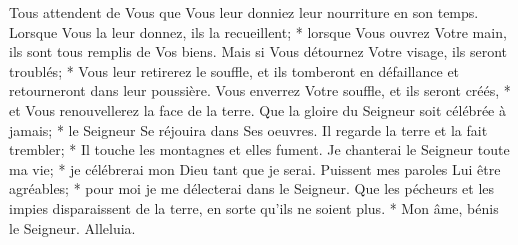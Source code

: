 Tous attendent de Vous que Vous leur donniez leur nourriture en son temps.
Lorsque Vous la leur donnez, ils la recueillent; * lorsque Vous ouvrez Votre main, ils sont tous remplis de Vos biens.
Mais si Vous détournez Votre visage, ils seront troublés; * Vous leur retirerez le souffle, et ils tomberont en défaillance et retourneront dans leur poussière.
Vous enverrez Votre souffle, et ils seront créés, * et Vous renouvellerez la face de la terre.
Que la gloire du Seigneur soit célébrée à jamais; * le Seigneur Se réjouira dans Ses oeuvres.
Il regarde la terre et la fait trembler; * Il touche les montagnes et elles fument.
Je chanterai le Seigneur toute ma vie; * je célébrerai mon Dieu tant que je serai.
Puissent mes paroles Lui être agréables; * pour moi je me délecterai dans le Seigneur.
Que les pécheurs et les impies disparaissent de la terre, en sorte qu'ils ne soient plus. * Mon âme, bénis le Seigneur. Alleluia.

